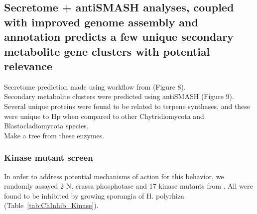 \subsection*{Secretome + antiSMASH analyses, coupled with improved genome assembly and annotation predicts a few unique secondary metabolite gene clusters with potential relevance}
Secretome prediction made using workflow from \cite{Min2010} (Figure 8). \\
\indent Secondary metabolite clusters were predicted using antiSMASH \cite{Blin2013} (Figure 9).\\
\indent Several unique proteins were found to be related to terpene synthases, and these were unique to Hp when compared to other Chytridiomycota and Blastocladiomycota species.\\
\indent Make a tree from these enzymes.\\
\subsubsection*{Kinase mutant screen}
In order to address potential mechanisms of action for this behavior, we randomly assayed 2 N. crassa phosphotase and 17 kinase mutants from \cite{Park2011}. All were found to be inhibited by growing sporangia of H. polyrhiza (Table~\ref{tab:ChInhib_Kinase}).\\
